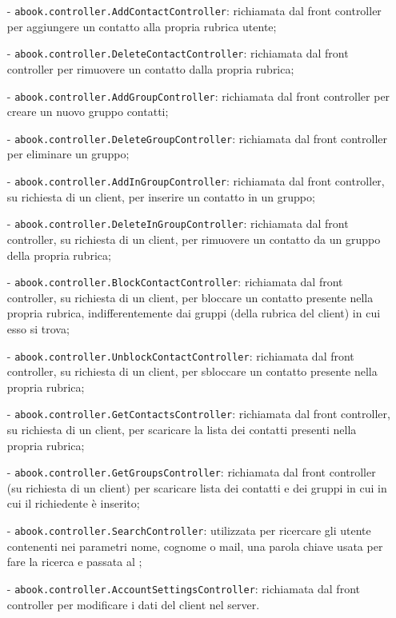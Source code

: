 \begin{description}
\begin{itemize}
	  \item[-] \texttt{abook.controller.AddContactController}: richiamata dal front controller per aggiungere un contatto alla propria rubrica utente;
	  \item[-] \texttt{abook.controller.DeleteContactController}: richiamata dal front controller per rimuovere un contatto dalla propria rubrica;
	  \item[-] \texttt{abook.controller.AddGroupController}: richiamata dal front controller per creare un nuovo gruppo contatti;
	  \item[-] \texttt{abook.controller.DeleteGroupController}: richiamata dal front controller per eliminare un gruppo;
	  \item[-] \texttt{abook.controller.AddInGroupController}: richiamata dal front controller, su richiesta di un client, per inserire un contatto in un gruppo;
	  \item[-] \texttt{abook.controller.DeleteInGroupController}: richiamata dal front controller, su richiesta di un client, per rimuovere un contatto da un gruppo della propria rubrica;
	  \item[-] \texttt{abook.controller.BlockContactController}: richiamata dal front controller, su richiesta di un client, per bloccare un contatto presente nella propria rubrica, indifferentemente dai gruppi (della rubrica del client) in cui esso si trova;
	  \item[-] \texttt{abook.controller.UnblockContactController}: richiamata dal front controller, su richiesta di un client, per sbloccare un contatto presente nella propria rubrica;
	  \item[-] \texttt{abook.controller.GetContactsController}: richiamata dal front controller, su richiesta di un client, per scaricare la lista dei contatti presenti nella propria rubrica;
	  \item[-] \texttt{abook.controller.GetGroupsController}: richiamata dal front controller (su richiesta di un client) per scaricare lista dei contatti e dei gruppi in cui in cui il richiedente è inserito;
	  \item[-] \texttt{abook.controller.SearchController}: utilizzata per ricercare gli utente contenenti nei parametri nome, cognome o mail, una parola chiave usata per fare la ricerca e passata al ;
	  \item[-] \texttt{abook.controller.AccountSettingsController}: richiamata dal front controller per modificare i dati del client nel server.
\end{itemize}


\end{description}
